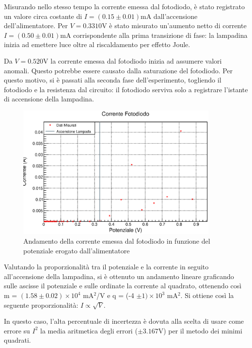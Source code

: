 \documentclass[a4paper]{article}
\begin{document}
Misurando nello stesso tempo la corrente emessa dal fotodiodo, è stato registrato un valore circa costante di $I=(0.15 \pm 0.01)$mA dall'accensione dell'alimentatore. Per $V=0.3310$V è stato misurato un'aumento netto di corrente $I=(0.50 \pm 0.01)$mA corrispondente alla prima transizione di fase: la lampadina inizia ad emettere luce oltre al riscaldamento per effetto Joule. 

Da $V=0.520$V la corrente emessa dal fotodiodo inizia ad assumere valori anomali. Questo potrebbe essere causato dalla saturazione del fotodiodo. Per questo motivo, si è passati alla seconda fase dell'esperimento, togliendo il fotodiodo e la resistenza dal circuito: il fotodiodo serviva solo a registrare l'istante di accensione della lampadina. 

\begin{figure}[!htbp]
  \centering
      \includegraphics[width=0.9\textwidth]{immagini/fotodiodografico.eps}
        \caption{Andamento della corrente emessa dal fotodiodo in funzione del potenziale erogato dall'alimentatore}
\end{figure}
\FloatBarrier

Valutando la proporzionalità tra il potenziale e la corrente in seguito all'accensione della lampadina, si è ottenuto un andamento lineare graficando sulle ascisse il potenziale e sulle ordinate la corrente al quadrato, ottenendo così m = $(1.58\pm0.02) \times 10^4$ mA$^2$/V e q = (-4 $\pm 1) \times 10^3$ mA$^2$. Si ottiene così la seguente proporzionalità: $I\propto \sqrt{V}$.

In questo caso, l'alta percentuale di incertezza è dovuta alla scelta di usare come errore su $I^2$ la media aritmetica degli errori ($\pm 3.167$V) per il metodo dei minimi quadrati. 
\end{document}

